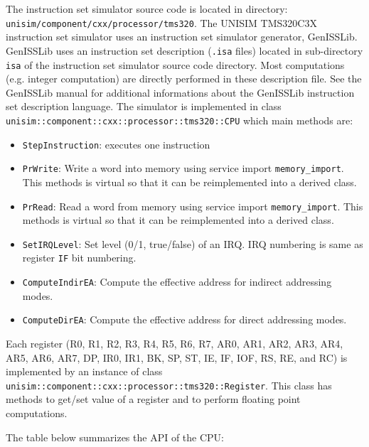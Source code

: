 The instruction set simulator source code is located in directory: \newline \texttt{unisim/component/cxx/processor/tms320}.\newline
The UNISIM TMS320C3X instruction set simulator uses an instruction set simulator generator, GenISSLib.
GenISSLib uses an instruction set description (\texttt{.isa} files) located in sub-directory \texttt{isa} of the instruction set simulator source code directory.
Most computations (e.g. integer computation) are directly performed in these description file.
See the GenISSLib manual for additional informations about the GenISSLib instruction set description language.
The simulator is implemented in class \texttt{unisim::component::cxx::processor::tms320::CPU} which main methods are:
\begin{itemize}
\item \texttt{StepInstruction}: executes one instruction
\item \texttt{PrWrite}: Write a word into memory using service import \texttt{memory\_import}. This methods is virtual so that it can be reimplemented into a derived class.
\item \texttt{PrRead}: Read a word from memory using service import \texttt{memory\_import}. This methods is virtual so that it can be reimplemented into a derived class.
\item \texttt{SetIRQLevel}: Set level (0/1, true/false) of an IRQ. IRQ numbering is same as register \texttt{IF} bit numbering.
\item \texttt{ComputeIndirEA}: Compute the effective address for indirect addressing modes.
\item \texttt{ComputeDirEA}: Compute the effective address for direct addressing modes.
\end{itemize}

Each register (R0, R1, R2, R3, R4, R5, R6, R7, AR0, AR1, AR2, AR3, AR4, AR5, AR6, AR7, DP, IR0, IR1, BK, SP, ST, IE, IF, IOF, RS, RE, and RC) is implemented by an instance of class \texttt{unisim::component::cxx::processor::tms320::Register}.
This class has methods to get/set value of a register and to perform floating point computations.

\noindent The table below summarizes the API of the CPU:

